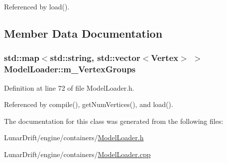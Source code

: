Referenced by load().



\subsection{Member Data Documentation}
\subsubsection[{\texorpdfstring{m\+\_\+\+Vertex\+Groups}{m_VertexGroups}}]{\setlength{\rightskip}{0pt plus 5cm}std\+::map$<$std\+::string, std\+::vector$<${\bf Vertex}$>$ $>$ Model\+Loader\+::m\+\_\+\+Vertex\+Groups\hspace{0.3cm}{\ttfamily [private]}}\hypertarget{class_model_loader_a4e239d555b06365c128cec1b70a5f0fa}{}\label{class_model_loader_a4e239d555b06365c128cec1b70a5f0fa}


Definition at line 72 of file Model\+Loader.\+h.



Referenced by compile(), get\+Num\+Vertices(), and load().



The documentation for this class was generated from the following files\+:\begin{DoxyCompactItemize}
\item 
Lunar\+Drift/engine/containers/\hyperlink{_model_loader_8h}{Model\+Loader.\+h}\item 
Lunar\+Drift/engine/containers/\hyperlink{_model_loader_8cpp}{Model\+Loader.\+cpp}\end{DoxyCompactItemize}
